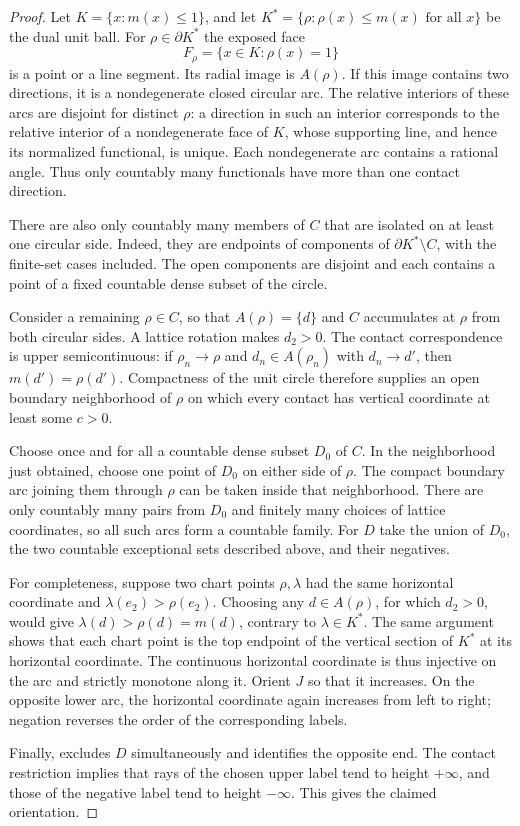 \begin{proof}
Let $K=\{x:m(x)\leq1\}$, and let
$K^*=\{\rho:\rho(x)\leq m(x)\text{ for all }x\}$ be the dual unit ball.
For $\rho\in\partial K^*$ the exposed face
\[
 F_\rho=\{x\in K:\rho(x)=1\}
\]
is a point or a line segment.  Its radial image is $A(\rho)$.  If this
image contains two directions, it is a nondegenerate closed circular arc.
The relative interiors of these arcs are disjoint for distinct $\rho$:
a direction in such an interior corresponds to the relative interior of a
nondegenerate face of $K$, whose supporting line, and hence its normalized
functional, is unique.  Each nondegenerate arc contains a rational angle.
Thus only countably many functionals have more than one contact direction.

There are also only countably many members of $C$ that are isolated on
at least one circular side.  Indeed, they are endpoints of components of
$\partial K^*\setminus C$, with the finite-set cases included.  The open
components are disjoint and each contains a point of a fixed countable
dense subset of the circle.

Consider a remaining $\rho\in C$, so that $A(\rho)=\{d\}$ and $C$
accumulates at $\rho$ from both circular sides.  A lattice rotation makes
$d_2>0$.  The contact correspondence is upper semicontinuous: if
$\rho_n\to\rho$ and $d_n\in A(\rho_n)$ with $d_n\to d'$, then
$m(d')=\rho(d')$.  Compactness of the unit circle therefore supplies an
open boundary neighborhood of $\rho$ on which every contact has vertical
coordinate at least some $c>0$.

Choose once and for all a countable dense subset $D_0$ of $C$.  In the
neighborhood just obtained, choose one point of $D_0$ on either side of
$\rho$.  The compact boundary arc joining them through $\rho$ can be taken
inside that neighborhood.  There are only countably many pairs from
$D_0$ and finitely many choices of lattice coordinates, so all such arcs
form a countable family.  For $D$ take the union of $D_0$, the two
countable exceptional sets described above, and their negatives.

For completeness, suppose two chart points $\rho,\lambda$ had the same
horizontal coordinate and $\lambda(e_2)>\rho(e_2)$.  Choosing any
$d\in A(\rho)$, for which $d_2>0$, would give
$\lambda(d)>\rho(d)=m(d)$, contrary to $\lambda\in K^*$.
The same argument shows that each chart point is the top endpoint of
the vertical section of $K^*$ at its horizontal coordinate.
The continuous horizontal coordinate is thus injective on the arc and
strictly monotone along it.  Orient $J$ so that it increases.  On the
opposite lower arc, the horizontal coordinate again increases from left
to right; negation reverses the order of the corresponding labels.

Finally,  excludes $D$ simultaneously and identifies
the opposite end.  The contact restriction implies that rays of the
chosen upper label tend to height $+\infty$, and those of the negative
label tend to height $-\infty$.  This gives the claimed orientation.
\end{proof}


